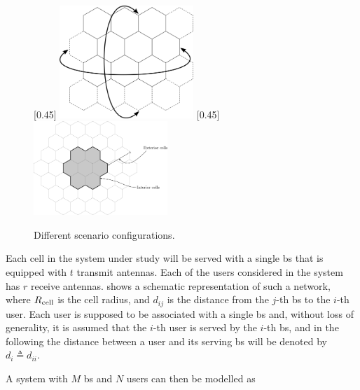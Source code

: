 \begin{figure}[t]
    [0.45\textwidth]
    {
     \includegraphics[width=0.45\textwidth]{./03.system_model/img/torus_scenario}
    }
    \hfill
    [0.45\textwidth]
    {
    \includegraphics[width=0.45\textwidth]{./03.system_model/img/interfering_scenario}
    }
    \caption{Different scenario configurations.}\label{fig:scenario_types}
\end{figure}

Each cell in the system under study will be served with a single \gls{bs} that
is equipped with $t$ transmit antennas. Each of the users considered in the
system has $r$ receive antennas.  shows a
schematic representation of such a network, where $R_{\text{cell}}$ is the cell
radius, and $d_{ij}$ is the distance from the $j$-th \gls{bs} to the $i$-th
user. Each user is supposed to be associated with a single \gls{bs} and, without
loss of generality, it is assumed that the $i$-th user is served by the $i$-th
\gls{bs}, and in the following the distance between a user and its serving
\gls{bs} will be denoted by $d_i \triangleq d_{ii}$.

A system with $M$ \gls{bs} and $N$ users can then be modelled as


